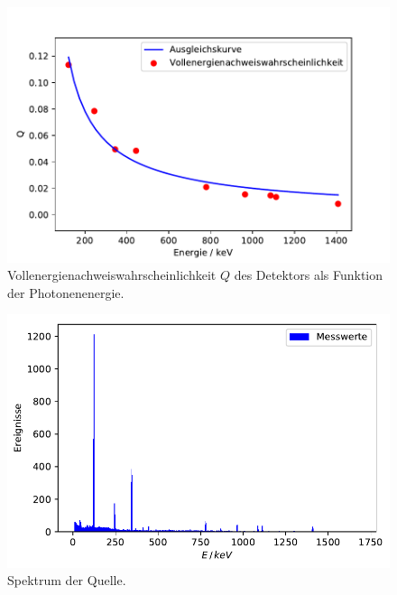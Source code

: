 \begin{figure}[H]
   \centering
   \includegraphics[width = .7\textwidth]{../Plots/Effizienz.pdf}
   \caption{Vollenergienachweiswahrscheinlichkeit $Q$ des Detektors als Funktion der Photonenenergie.}
   \label{fig:Vollenergienachweiswahrscheinlichekeit}
\end{figure}

\begin{figure}[H]
  \centering
  \includegraphics[width=.7\textwidth]{../Plots/Eu_Spektrum.pdf}
  \caption{Spektrum der  Quelle.}
  \label{fig:Eu_Spektrum}
\end{figure}

